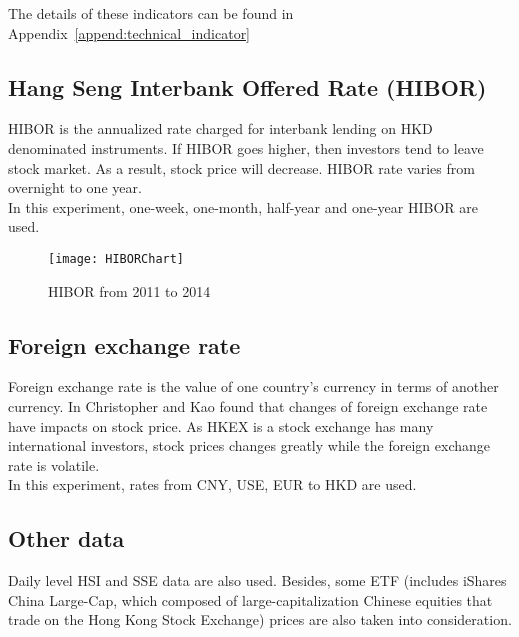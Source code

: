The details of these indicators can be found in Appendix~\ref{append:technical_indicator}

\subsection{Hang Seng Interbank Offered Rate (HIBOR)}
HIBOR is the annualized rate charged for interbank lending on HKD denominated instruments\cite{chen2010principal}. If HIBOR goes higher, then investors tend to leave stock market. As a result, stock price will decrease. HIBOR rate varies from overnight to one year. \\

In this experiment, one-week, one-month, half-year and one-year HIBOR are used. 

\begin{figure}[h]
	\centering
	\texttt{[image: HIBORChart]}
	\caption{HIBOR from 2011 to 2014}
\end{figure}



\subsection{Foreign exchange rate}
Foreign exchange rate is the value of one country’s currency in terms of another currency. In \cite{ma1990exchange} Christopher and Kao found that changes of foreign exchange rate have impacts on stock price. As HKEX is a stock exchange has many international investors, stock prices changes greatly while the foreign exchange rate is volatile.\\


In this experiment, rates from CNY, USE, EUR to HKD are used.

\subsection{Other data}
Daily level HSI and SSE data are also used. Besides, some ETF (includes iShares China Large-Cap, which composed of large-capitalization Chinese equities that trade on the Hong Kong Stock Exchange) prices are also taken into consideration.
